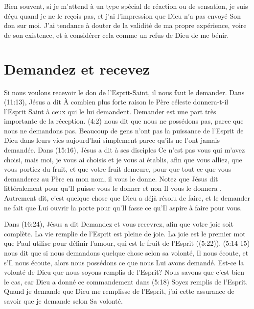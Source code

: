 Bien souvent, si je m'attend à un type spécial de réaction ou de sensation,
 je suis déçu quand je ne le reçois pas, et j'ai l'impression que Dieu
 n'a pas envoyé Son don sur moi. J'ai tendance à douter de la validité
 de ma propre expérience, 
 voire de son existence, et à considérer cela
 comme un refus de Dieu de me bénir.


\section{Demandez et recevez}

Si nous voulons recevoir le don de l'Esprit-Saint,
 il nous faut le demander. Dans (11:13), Jésus a dit\frcolon{}
 \Og À combien plus forte raison le Père céleste donnera-t-il
 l'Esprit Saint à ceux qui le lui demandent. \Fg{}
 Demander est une part très importante de la réception.
 (4:2) nous dit que nous ne possédons pas,
 parce que nous ne demandons pas. Beaucoup de gens n'ont pas
 la puissance de l'Esprit de Dieu dans leurs vies aujourd'hui
 simplement parce qu'ils ne l'ont jamais demandée.
 Dans (15:16), Jésus a dit à ses disciples\frcolon{}
 \Og Ce n'est pas vous qui m'avez choisi, mais moi,
 je vous ai choisis et je vous ai établis, afin que vous alliez,
 que vous portiez du fruit, et que votre fruit demeure,
 pour que tout ce que vous demanderez au Père en mon nom,
 il vous le donne. \Fg{}
 Notez que Jésus dit littéralement\frcolon{} \Og pour qu'Il puisse vous le donner \Fg{} et non
 \Og Il vous le donnera \Fg{}.
 Autrement dit, c'est quelque chose que Dieu a déjà résolu de faire,
 et le demander ne fait que Lui ouvrir la porte pour qu'Il fasse
 ce qu'Il aspire à faire pour vous.

Dans (16:24), Jésus a dit\frcolon{}
 \Og Demandez et vous recevrez, afin que votre joie soit complète. \Fg{}
 La vie remplie de l'Esprit est pleine de joie.
 La joie est le premier mot que Paul utilise pour définir l'amour,
 qui est le fruit de l'Esprit ((5:22)).
 (5:14-15) nous dit que si nous demandons quelque chose
 selon sa volonté, Il nous écoute, et s'Il nous écoute,
 alors nous possédons ce que nous Lui avons demandé.
 Est-ce la volonté de Dieu que nous soyons remplis de l'Esprit?
 Nous savons que c'est bien le cas, car Dieu a donné ce commandement dans
 (5:18)\frcolon{} \Og Soyez remplis de l'Esprit. \Fg{}
 Quand je demande que Dieu me remplisse de l'Esprit,
 j'ai cette assurance de savoir que je demande selon Sa volonté.

